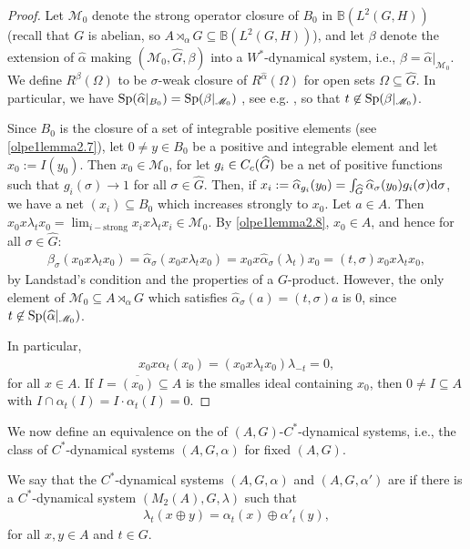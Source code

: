 \begin{proof}
Let $\mathscr{M}_0$ denote the strong operator closure of $B_0$ in $\mathbb{B}(L^2(G,H))$ (recall that $G$ is abelian, so $A \rtimes_\alpha G \subseteq \mathbb{B}(L^2(G,H))$), and let $\beta$ denote the extension of $\hat \alpha$ making $(\mathscr{M}_0, \hat G, \beta)$ into a $W^*$-dynamical system, i.e., $\beta = \hat \alpha|_{\mathscr{M}_0}$. We define $R^{\beta}(\Omega)$ to be $\sigma$-weak closure of $R^{\hat \alpha}(\Omega)$ for open sets $\Omega \subseteq \hat G$. In particular, we have $\mathrm{Sp}(\widehat{\alpha}|_{B_0})= \mathrm{Sp}(\beta|_{\mathscr{M}_0})$ , see e.g. \cite[Proposition 8.8.9]{pedersenalgauto}, so that $t \not \in \mathrm{Sp}(\beta|_{\mathscr{M}_0})$.

Since $B_0$ is the closure of a set of integrable positive elements (see \cref{olpe1lemma2.7}), let $0 \neq y \in B_0$ be a positive and integrable element and let $x_0 := I(y_0)$. Then $x_0 \in \mathscr{M}_0$, for let $g_i \in C_c(\widehat{G})$ be a net of positive functions such that $g_i(\sigma)\to 1$ for all $\sigma \in \hat G$. Then, if $x_i := \widehat{\alpha}_{g_i}(y_0) = \int_{\widehat{G}} \widehat{\alpha}_{\sigma}(y_0) g_i(\sigma) \mathrm{d} \sigma $, we have a net $(x_i) \subseteq B_0$ which increases strongly to $x_0$. Let $a \in A$. Then $x_0 x \lambda_t x_0 = \lim_{i-\text{strong}} x_i x \lambda_t x_i \in \mathscr{M}_0$. By \cref{olpe1lemma2.8}, $x_0 \in A$, and hence for all $\sigma \in \hat G$:
\begin{align*}
	\beta_{\sigma}(x_0 x \lambda_t x_0) = \hat \alpha_\sigma( x_0 x \lambda_t x_0) = x_0 x \hat \alpha_\sigma(\lambda_t) x_0 =  (t,\sigma) x_0 x \lambda_t x_0,
\end{align*}
by Landstad's condition and the properties of a $G$-product. However, the only element of $\mathscr{M}_0 \subseteq A \rtimes_\alpha G$ which satisfies $\hat \alpha_\sigma (a)=(t,\sigma) a$ is $0$, since $t \not \in \mathrm{Sp}(\widehat{\alpha} |_{\mathscr{M}_0})$.

In particular,
\begin{align*}
	x_0 x \alpha_t(x_0) = (x_0 x \lambda_t x_0) \lambda_{-t} = 0,
\end{align*}
for all $x \in A$. If $I = \overline{(x_0)} \subseteq A$ is the smalles ideal containing $x_0$, then $0 \neq I \subseteq A$ with $I \cap \alpha_t(I)=I\cdot\alpha_t(I)=0$.
\end{proof}
We now define an equivalence on the of $(A,G)$-$C^*$-dynamical systems, i.e., the class of $C^*$-dynamical systems $(A, G, \alpha)$ for fixed $(A,G)$. 
\begin{definition}
	We say that the $C^*$-dynamical systems $(A,G,\alpha)$ and $(A, G, \alpha')$ are  if there is a $C^*$-dynamical system $(M_2(A), G, \lambda)$ such that
	\begin{align*}
		\lambda_t (x \oplus y) = \alpha_t(x) \oplus \alpha'_t(y),
	\end{align*}
	for all $x,y \in A$ and $t \in G$.
\end{definition}
